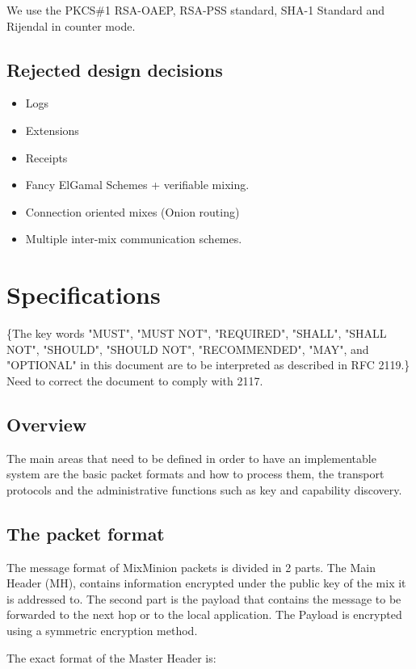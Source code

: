 \documentclass{article}
\begin{document}
We use the PKCS\#1 RSA-OAEP, RSA-PSS standard, SHA-1 Standard and
Rijendal in counter mode. 

\subsection{Rejected design decisions}

\begin{itemize}
\item Logs
\item Extensions
\item Receipts
\item Fancy ElGamal Schemes + verifiable mixing.
\item Connection oriented mixes (Onion routing)
\item Multiple inter-mix communication schemes.
\end{itemize}

\section{Specifications}

\{The key words "MUST", "MUST NOT", "REQUIRED", "SHALL", "SHALL
NOT", "SHOULD", "SHOULD NOT", "RECOMMENDED",  "MAY", and
"OPTIONAL" in this document are to be interpreted as described in
RFC 2119.\} Need to correct the document to comply with 2117.

\subsection{Overview}

The main areas that need to be defined in order to have an
implementable system are the basic packet formats and how to process
them, the transport protocols and the administrative functions such as
key and capability discovery. 

\subsection{The packet format}

The message format of MixMinion packets is divided in
2 parts. The Main Header (MH), contains information encrypted under 
the public key of the mix it is addressed to. The second part is the 
payload that contains the message to be forwarded to the next hop or 
to the local application. The Payload is encrypted using a symmetric 
encryption method.

The exact format of the Master Header is:
\end{document}
